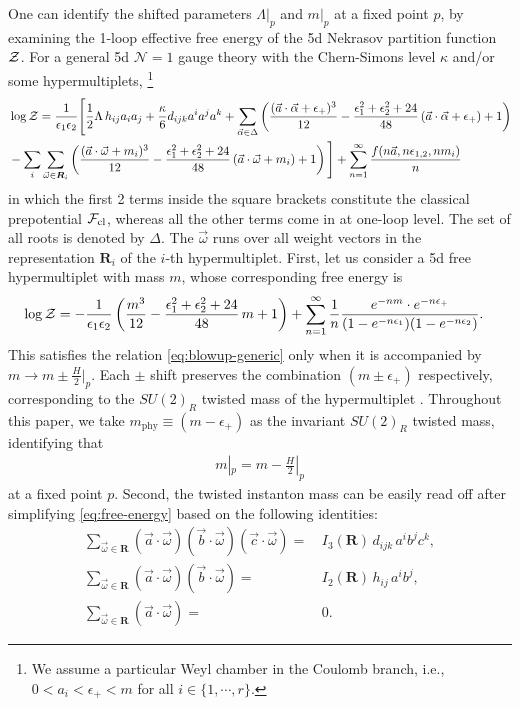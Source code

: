 \documentclass[letterpaper, 11pt]{article}
\newcommand{\nn}{\nonumber}
\def\CF{{\cal F}}
\def\CZ{{\cal Z}}
\def\e{\epsilon}
\begin{document}
One can identify the shifted parameters $\Lambda|_p$ and $m|_p$ at a fixed point $p$, by examining the 1-loop effective free energy of the 5d Nekrasov partition function $\CZ$. For a general 5d $\mathcal{N}=1$ gauge theory with the Chern-Simons level $\kappa$ and/or some hypermultiplets,
\footnote{We assume a particular Weyl chamber in the Coulomb branch, i.e., $ 0< a_i < \e_+ < m$ for all $i\in \{1,\cdots, r\}$.}
\begin{align}
  \label{eq:free-energy}
  & \log{\CZ} = \frac{1}{\epsilon_1\epsilon_2}\Bigg[\frac{1}{2}\Lambda \, h_{ij}a_i a_j +\frac{\kappa}{6}d_{ijk} a^{i}a^j a^k +  \sum_{\vec{\alpha}\in\Delta}\left(\frac{(\vec{a}\cdot\vec{\alpha}+\e_+)^3}{12}-\frac{\e_1^2+\e_2^2+24}{48}\,(\vec{a}\cdot\vec{\alpha}+\e_+)+1\right)\nn \\
  &-\sum_i\sum_{\vec{\omega}\in\boldsymbol{R}_i}\left(\frac{(\vec{a}\cdot\vec{\omega}+m_i)^3}{12}-\frac{\e_1^2+\e_2^2+24}{48}\,(\vec{a}\cdot\vec{\omega}+m_i)+1\right)\Bigg] + \sum_{n=1}^\infty\frac{ f(n\vec{a},n\epsilon_{1,2},nm_i)}{n}
\end{align}
in which the first 2 terms inside the square brackets constitute the classical prepotential $\CF_\text{cl}$, whereas all the other terms come in at one-loop level.  The set of all roots is denoted by $\Delta$. The $\vec{\omega}$ runs over all weight vectors in the representation $\mathbf{R}_i$ of the $i$-th hypermultiplet. First, let us consider a 5d free hypermultiplet with mass $m$, whose corresponding free energy is 
\begin{align}
  \label{eq:free-hyper}
  & \log{\CZ} = -\frac{1}{\epsilon_1\epsilon_2} \left(\frac{m^3}{12}-\frac{\e_1^2+\e_2^2+24}{48}\,m +1\right) + \sum_{n=1}^\infty\frac{ 1}{n} \frac{e^{-nm}\cdot e^{-n\e_+}}{(1-e^{-n\e_1})(1-e^{-n\e_2})}.
\end{align}
This satisfies the relation \eqref{eq:blowup-generic} only when it is accompanied by $m \rightarrow m \pm \frac{H}{2}|_p$. 
Each $\pm$ shift preserves the combination $(m \pm \e_+)$ respectively,  corresponding to the $SU(2)_R$ twisted mass of the hypermultiplet \cite{Okuda:2010ke}. Throughout this paper, we take $m_\text{phy} \equiv (m- \e_+)$ as the invariant $SU(2)_R$ twisted mass, identifying that 
\begin{align}
  \label{eq:mass-shift}
  m|_p = m - \frac{H}{2}|_p
\end{align}
at a fixed point $p$. Second, the twisted instanton mass can be easily read off after simplifying \eqref{eq:free-energy} based on the following identities:
\begin{align}
  \textstyle \sum_{\vec{\omega}\in\boldsymbol{R}}(\vec{a}\cdot\vec{\omega})(\vec{b}\cdot\vec{\omega})(\vec{c}\cdot\vec{\omega})=&\,I_3(\boldsymbol{R})\,d_{ijk}\,a^ib^jc^k,\nonumber \\
  \textstyle \sum_{\vec{\omega}\in\boldsymbol{R}}(\vec{a}\cdot\vec{\omega})(\vec{b}\cdot\vec{\omega})=&\,I_2(\boldsymbol{R})\,h_{ij}\,a^ib^j,\\
  \textstyle \sum_{\vec{\omega}\in\boldsymbol{R}}(\vec{a}\cdot\vec{\omega})=&\,0.\nonumber
\end{align}
\end{document}
